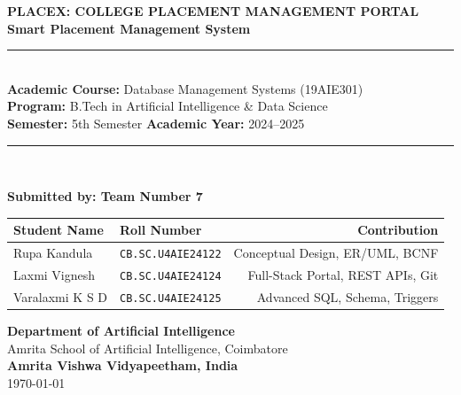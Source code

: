 \documentclass[11pt,a4paper]{article}
\begin{document}
\begin{titlepage}
    \centering
    \vspace*{0.5cm}
    
    {\Huge \textbf{\color{primaryblue}PLACEX: COLLEGE PLACEMENT MANAGEMENT PORTAL}}\\[0.4cm]
    {\Large \textbf{\color{accentblue}Smart Placement Management System}}\\[0.8cm]
    
    \rule{\linewidth}{1.2pt}\\[0.5cm]
    {\large \textbf{Academic Course:} Database Management Systems (19AIE301)}\\[0.2cm]
    {\large \textbf{Program:} B.Tech in Artificial Intelligence \& Data Science}\\[0.2cm]
    {\large \textbf{Semester:} 5th Semester \quad\textbar\quad \textbf{Academic Year:} 2024--2025}\\[0.5cm]
    \rule{\linewidth}{1.2pt}\\[1.5cm]
    
    \begin{minipage}{0.85\textwidth}
        \centering
        \textbf{\large Submitted by: Team Number 7}\\[0.5cm]
        \begin{tabular}{llr}
            \toprule
            \textbf{Student Name} & \textbf{Roll Number} & \textbf{Contribution} \\
            \midrule
            Rupa Kandula & \texttt{CB.SC.U4AIE24122} & Conceptual Design, ER/UML, BCNF \\
            Laxmi Vignesh & \texttt{CB.SC.U4AIE24124} & Full-Stack Portal, REST APIs, Git \\
            Varalaxmi K S D & \texttt{CB.SC.U4AIE24125} & Advanced SQL, Schema, Triggers \\
            \bottomrule
        \end{tabular}
    \end{minipage}
    
    \vfill
    
    {\large \textbf{Department of Artificial Intelligence}}\\[0.2cm]
    {\large Amrita School of Artificial Intelligence, Coimbatore}\\[0.2cm]
    {\Large \textbf{Amrita Vishwa Vidyapeetham, India}}\\[0.6cm]
    {\normalsize \today}
    
\end{titlepage}
\end{document}

